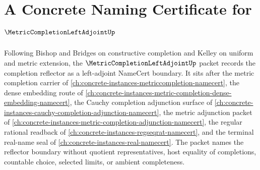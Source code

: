 \chapter{A Concrete Naming Certificate for $\MetricCompletionLeftAdjointUp$}
\label{ch:concrete-instances-metric-completion-left-adjoint-namecert}

Following Bishop and Bridges on constructive completion and Kelley on uniform and metric extension, the $\MetricCompletionLeftAdjointUp$ packet records the completion reflector as a left-adjoint NameCert boundary. It sits after the metric completion carrier of \autoref{ch:concrete-instances-metriccompletion-namecert}, the dense embedding route of \autoref{ch:concrete-instances-metric-completion-dense-embedding-namecert}, the Cauchy completion adjunction surface of \autoref{ch:concrete-instances-cauchy-completion-adjunction-namecert}, the metric adjunction packet of \autoref{ch:concrete-instances-metric-completion-adjunction-namecert}, the regular rational readback of \autoref{ch:concrete-instances-regseqrat-namecert}, and the terminal real-name seal of \autoref{ch:concrete-instances-real-namecert}. The packet names the reflector boundary without quotient representatives, host equality of completions, countable choice, selected limits, or ambient completeness.


